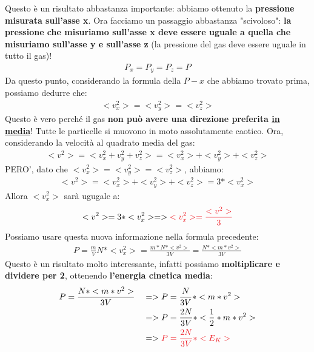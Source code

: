                     Questo è un risultato abbastanza importante: abbiamo ottenuto la \textbf{pressione misurata sull'asse x}. Ora facciamo un passaggio abbastanza "scivoloso": \textbf{la pressione che misuriamo sull'asse x deve essere uguale a quella che misuriamo sull'asse y e sull'asse z} (la pressione del gas deve essere uguale in tutto il gas)!
                    \begin{align*}
                        P_x=P_y=P_z=P
                    \end{align*}
                    Da questo punto, considerando la formula della $P-x$ che abbiamo trovato prima, possiamo dedurre che:
                    \begin{align*}
                        <v_x^2>=<v_y^2>=<v_z^2>
                    \end{align*}
                    Questo è vero perché il gas \textbf{non può avere una direzione preferita \underline{in media}}! Tutte le particelle si muovono in moto assolutamente caotico. Ora, considerando la velocità al quadrato media del gas:
                    \begin{align*}
                        <v^2>=<v_x^2+v_y^2+v_z^2>=<v_x^2>+<v_y^2>+<v_z^2>
                    \end{align*}
                    PERO', dato che $<v_x^2>=<v_y^2>=<v_z^2>$, abbiamo:
                    \begin{align*}
                        <v^2>=<v_x^2>+<v_y^2>+<v_z^2>=3*<v_x^2>
                    \end{align*}
                    Allora $<v_x^2>$ sarà ugugale a:
                    \begin{align*}
                        <v^2>=3*<v_x^2>=>\textcolor{Red}{<v_x^2>=\frac{<v^2>}{3}}
                    \end{align*}
                    Possiamo usare questa nuova informazione nella formula precedente:
                    \begin{align*}
                        P=\frac{m}{V}N*<v_{x}^2>=\frac{m*N*<v^2>}{3V}=\frac{N*<m*v^2>}{3V}
                    \end{align*}
                    Questo è un risultato molto interessante, infatti possiamo \textbf{moltiplicare e dividere per 2}, ottenendo \textbf{l'energia cinetica media}:
                    \begin{align*}
                        &P=\frac{N*<m*v^2>}{3V}&&=>P=\frac{N}{3V}*<m*v^2>\\
                        & &&=>P=\frac{2N}{3V}*<\frac{1}{2}*m*v^2>\\
                        & &&=>\textcolor{Red}{P=\frac{2N}{3V}*<E_K>}
                    \end{align*}
